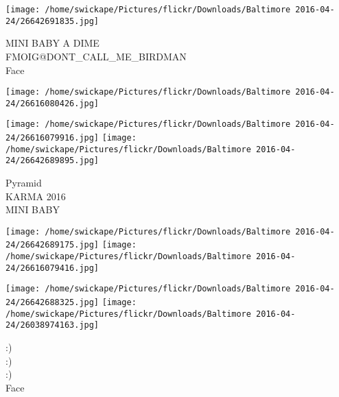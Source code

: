 \documentclass[10pt,letterpaper]{article}
\begin{document}
\texttt{[image: /home/swickape/Pictures/flickr/Downloads/Baltimore 2016-04-24/26642691835.jpg]}

MINI BABY A DIME\\
FMOIG@DONT\_CALL\_ME\_BIRDMAN\\
Face\\
\pagebreak

\texttt{[image: /home/swickape/Pictures/flickr/Downloads/Baltimore 2016-04-24/26616080426.jpg]}

\vspace{0.25in}
\texttt{[image: /home/swickape/Pictures/flickr/Downloads/Baltimore 2016-04-24/26616079916.jpg]}
\texttt{[image: /home/swickape/Pictures/flickr/Downloads/Baltimore 2016-04-24/26642689895.jpg]}

Pyramid\\
KARMA 2016\\
MINI BABY\\
\pagebreak

\texttt{[image: /home/swickape/Pictures/flickr/Downloads/Baltimore 2016-04-24/26642689175.jpg]}
\texttt{[image: /home/swickape/Pictures/flickr/Downloads/Baltimore 2016-04-24/26616079416.jpg]}

\texttt{[image: /home/swickape/Pictures/flickr/Downloads/Baltimore 2016-04-24/26642688325.jpg]}
\texttt{[image: /home/swickape/Pictures/flickr/Downloads/Baltimore 2016-04-24/26038974163.jpg]}

:)\\
:)\\
:)\\
Face\\
\pagebreak
\end{document}
